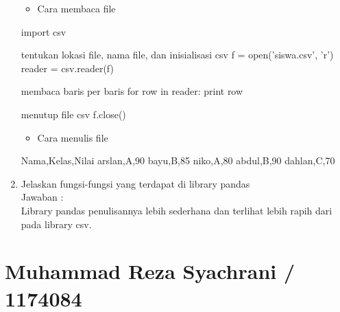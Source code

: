 \begin{enumerate}
\begin{itemize}
\item Cara membaca file
\end{itemize}
import csv

tentukan lokasi file, nama file, dan inisialisasi csv
f = open('siswa.csv', 'r')
reader = csv.reader(f)

membaca baris per baris
for row in reader:
    print row

menutup file csv
f.close()

\begin{itemize}
\item Cara menulis file
\end{itemize}
Nama,Kelas,Nilai
arslan,A,90
bayu,B,85
niko,A,80
abdul,B,90
dahlan,C,70

\item Jelaskan  fungsi-fungsi yang terdapat di library pandas\\
Jawaban :\\
Library pandas penulisannya lebih sederhana dan terlihat lebih rapih dari pada library csv.


\end{enumerate}



\section{Muhammad Reza Syachrani / 1174084}
